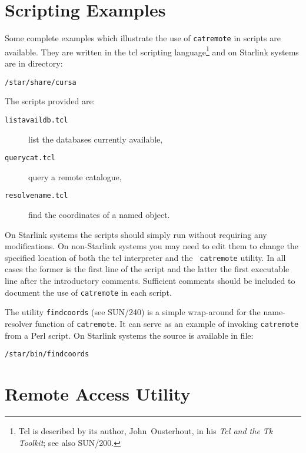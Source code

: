 \documentclass[twoside,11pt]{article}
\newcommand{\xref}[3]{#1}
\newcommand{\xlabel}[1]{}
\renewcommand{\_}{\texttt{\symbol{95}}}
\begin{document}
\section{\xlabel{S_EXAMPLES}\label{S_EXAMPLES}Scripting Examples}

Some complete examples which illustrate the use of {\tt catremote} in
scripts are available.  They are written in the tcl scripting
language\footnote{Tcl is described by its author, John~Ousterhout, in his
{\it Tcl and the Tk Toolkit}\/\cite{OUSTERHOUT94}; see also
\xref{SUN/200}{sun200}{}\cite{SUN200}.} and on Starlink systems are in
directory:

\begin{center}
{\tt /star/share/cursa}
\end{center}

The scripts provided are:

\begin{description}

  \item[{\tt listavaildb.tcl}] list the databases currently available,

  \item[{\tt querycat.tcl}] query a remote catalogue,

  \item[{\tt resolvename.tcl}] find the coordinates of a named object.

\end{description}

On Starlink systems the scripts should simply run without requiring any
modifications.  On non-Starlink systems you may need to edit them to
change the specified location of both the tcl interpreter and the {\tt
catremote} utility.  In all cases the former is the first line of the
script and the latter the first executable line after the introductory
comments.  Sufficient comments should be included to document the use of
{\tt catremote} in each script.

The utility {\tt findcoords} (see \xref{SUN/240}{sun240}{}\cite{SUN240})
is a simple wrap-around for the name-resolver function of {\tt catremote}.
It can serve as an example of invoking {\tt catremote} from a Perl script.
On Starlink systems the source is available in file:

\begin{center}
{\tt /star/bin/findcoords}
\end{center}


\section{\xlabel{WEBPROG}\label{WEBPROG}Remote Access Utility}
\end{document}

